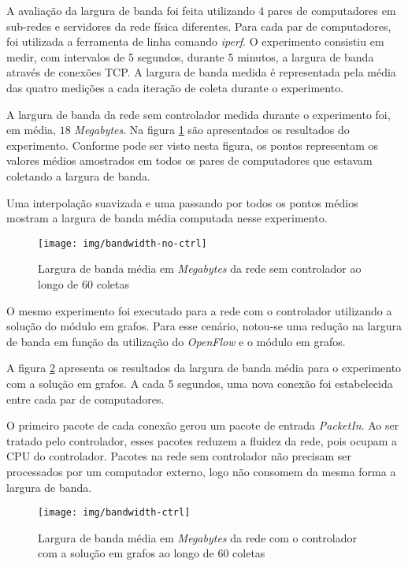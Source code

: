 A avaliação da largura de banda foi feita utilizando 4 pares de computadores
em sub-redes e servidores da rede física diferentes.
Para cada par de computadores, foi utilizada a ferramenta de linha comando
\emph{iperf}.
O experimento consistiu em medir, com intervalos de 5 segundos, durante 
5 minutos, a largura de banda através de conexões TCP.
A largura de banda medida é representada pela média das quatro medições a
cada iteração de coleta durante o experimento.

A largura de banda da rede sem controlador medida durante o experimento foi, 
em média, $18$ \emph{Megabytes}.
Na figura \ref{fig:bandwidth-no-ctrl} são apresentados os resultados do 
experimento. 
Conforme pode ser visto nesta figura, os pontos representam os valores 
médios amostrados em todos os pares de computadores que estavam coletando 
a largura de banda.

\break

Uma interpolação suavizada e uma passando por todos os pontos médios mostram
a largura de banda média computada nesse experimento.

\begin{figure}[!htb]
    \centering
    \label{fig:bandwidth-no-ctrl}
    \texttt{[image: img/bandwidth-no-ctrl]}
    \caption{Largura de banda média em \emph{Megabytes} da rede sem 
    controlador ao longo de 60 coletas}
\end{figure}

O mesmo experimento foi executado para a rede com o controlador utilizando 
a solução do módulo em grafos.
Para esse cenário, notou-se uma redução na largura de banda em função da 
utilização do \emph{OpenFlow} e o módulo em grafos.

A figura \ref{fig:bandwidth-ctrl} apresenta os resultados da largura de banda
média para o experimento com a solução em grafos.
A cada 5 segundos, uma nova conexão foi estabelecida entre cada par de 
computadores.

O primeiro pacote de cada conexão gerou um pacote de entrada \emph{PacketIn}.
Ao ser tratado pelo controlador, esses pacotes reduzem a fluidez da rede, pois
ocupam a CPU do controlador.
Pacotes na rede sem controlador não precisam ser processados por um computador
externo, logo não consomem da mesma forma a largura de banda.

\break

\begin{figure}[!htb]
    \centering
    \label{fig:bandwidth-ctrl}
    \texttt{[image: img/bandwidth-ctrl]}
    \caption{Largura de banda média em \emph{Megabytes} da rede com o 
        controlador com a solução em grafos ao longo de 60 coletas}
\end{figure}

